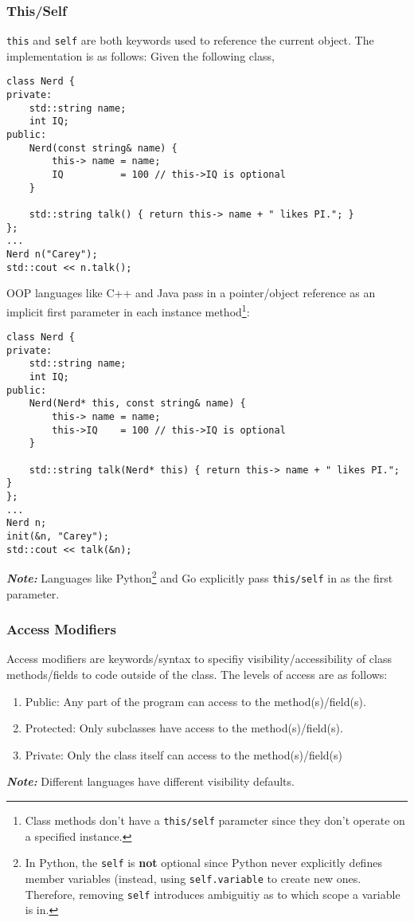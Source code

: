 \documentclass{article}
\begin{document}
\subsubsection{This/Self}
\texttt{this} and \texttt{self} are both keywords used to reference
the current object. The implementation is as follows: Given the
following class,
\begin{verbatim}
class Nerd {
private:
    std::string name;
    int IQ;
public:
    Nerd(const string& name) {
        this-> name = name;
        IQ          = 100 // this->IQ is optional
    }

    std::string talk() { return this-> name + " likes PI."; }
};
...
Nerd n("Carey");
std::cout << n.talk();
\end{verbatim}
OOP languages like C++ and Java pass in a pointer/object reference as
an implicit first parameter in each instance method\footnote{Class methods don't have a \texttt{this/self}
parameter since they don't operate on a specified instance.}:
\begin{verbatim}
class Nerd {
private:
    std::string name;
    int IQ;
public:
    Nerd(Nerd* this, const string& name) {
        this-> name = name;
        this->IQ    = 100 // this->IQ is optional
    }

    std::string talk(Nerd* this) { return this-> name + " likes PI."; }
};
...
Nerd n;
init(&n, "Carey");
std::cout << talk(&n);
\end{verbatim}
\textit{\textbf{Note:}} Languages like Python\footnote{In Python, the
  \texttt{self} is \textbf{not} optional since Python never explicitly defines
  member variables (instead, using \texttt{self.variable} to create
  new ones. Therefore, removing \texttt{self} introduces ambiguitiy as
  to which scope a variable is in.} and Go explicitly pass
\texttt{this/self} in as the first parameter.

\subsubsection{Access Modifiers}
Access modifiers are keywords/syntax to specifiy
visibility/accessibility of class methods/fields to code outside of
the class. The levels of access are as follows:
\begin{enumerate}[label=(\roman*)]
\item Public: Any part of the program can access to the method(s)/field(s).
\item Protected: Only subclasses have access to the method(s)/field(s).
\item Private: Only the class itself can access to the method(s)/field(s)
\end{enumerate}
\textit{\textbf{Note:}} Different languages have different visibility
defaults.
\end{document}
